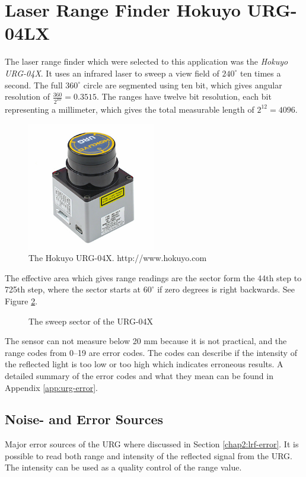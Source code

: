 \section{Laser Range Finder Hokuyo URG-04LX}
\label{chap3:sec-urg}
The laser range finder which were selected to this application was the \emph{Hokuyo
URG-04X}. It uses an infrared laser to sweep a view field of $240^\circ$ ten times a
second. The full $360^\circ$ circle are segmented using ten bit, which gives angular
resolution of $\frac{360}{2^{10}} = 0.3515$. The ranges have twelve bit resolution, each
bit representing a millimeter, which gives the total measurable length of $2^{12} = 4096$.
\begin{figure}[htbp]
    \centering
    \includegraphics[width=0.5\textwidth]{pics/urg04lx}
    \caption{The Hokuyo URG-04X. http://www.hokuyo.com}
    \label{chap3:fig-urg}
\end{figure}
The effective area which gives range readings are the sector form the 44th step to
725th step, where the sector starts at $60^\circ$ if zero degrees is right backwards. See
Figure \ref{chap3:fig-urg-sector}.
\begin{figure}[htbp]
    \centering
    \caption{The sweep sector of the URG-04X}
    \label{chap3:fig-urg-sector}
\end{figure}

The sensor can not measure below 20 mm because it is not practical, and the range codes
from 0--19 are error codes. The codes can describe if the intensity of the reflected light
is too low or too high which indicates erroneous results. A detailed summary of the
error codes and what they mean can be found in Appendix \ref{app:urg-error}.


\subsection{Noise- and Error Sources}
Major error sources of the URG where discussed in Section \ref{chap2:lrf-error}. It is
possible to read both range and intensity of the reflected signal from the URG. The
intensity can be used as a quality control of the range value. 





